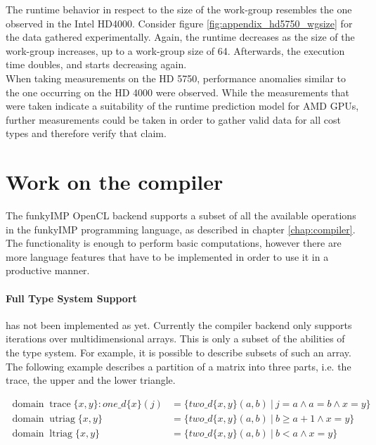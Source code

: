 The runtime behavior in respect to the size of the work-group resembles the one observed in the Intel HD4000. Consider figure \ref{fig:appendix_hd5750_wgsize} for the data gathered experimentally. Again, the runtime decreases as the size of the work-group increases, up to a work-group size of 64. Afterwards, the execution time doubles, and starts decreasing again. \\

When taking measurements on the HD 5750, performance anomalies similar to the one occurring on the HD 4000 were observed. While the measurements that were taken indicate a suitability of the runtime prediction model for AMD GPUs, further measurements could be taken in order to gather valid data for all cost types and therefore verify that claim. 

\newpage


\section{Work on the compiler}
\label{sect:future_compiler}

The funkyIMP OpenCL backend supports a subset of all the available operations in the funkyIMP programming language, as described in chapter \ref{chap:compiler}. The functionality is enough to perform basic computations, however there are more language features that have to be implemented in order to use it in a productive manner. \\

\paragraph{Full Type System Support} has not been implemented as yet. Currently the compiler backend only supports iterations over multidimensional arrays. This is only a subset of the abilities of the type system. For example, it is possible to describe subsets of such an array. The following example describes a partition of a matrix into three parts, i.e. the trace, the upper and the lower triangle.

\begin{align}
	\operatorname{domain} \operatorname{trace}\{x,y\} : one\_d\{x\}(j) &= \{ two\_d\{x,y\}(a,b)\ |\ j=a \wedge a=b \wedge x=y \} \\
	\operatorname{domain} \operatorname{utriag}\{x,y\} &= \{ two\_d\{x,y\}(a,b)\ |\ b \geq a+1 \wedge x=y \} \\
	\operatorname{domain} \operatorname{ltriag}\{x,y\} &= \{ two\_d\{x,y\}(a,b)\ |\ b<a \wedge x=y \} 
\end{align}

